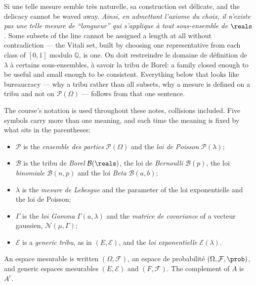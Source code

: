 Si une telle mesure semble très naturelle, sa construction est délicate, and the
delicacy cannot be waved away. \emph{Ainsi, en admettant l'axiome du choix, il
n'existe pas une telle mesure de ``longueur'' qui s'applique à tout sous-ensemble de
$\reals$.} Some subsets of the line cannot be assigned a length at all without
contradiction --- the Vitali set, built by choosing one representative from each
class of $[0,1]$ modulo $\mathbb{Q}$, is one. On doit restreindre le domaine de
définition de $\lambda$ à certains sous-ensembles, à savoir la tribu de Borel: a
family closed enough to be useful and small enough to be consistent. Everything
below that looks like bureaucracy --- why a tribu rather than all subsets, why a
mesure is defined on a tribu and not on $\mathcal{P}(\Omega)$ --- follows from that
one sentence.

\begin{notation}
  The course's notation is used throughout these notes, collisions included. Five
  symbols carry more than one meaning, and each time the meaning is fixed by what
  sits in the parentheses:
  \begin{itemize}
    \item $\mathcal{P}$ is the \emph{ensemble des parties} $\mathcal{P}(\Omega)$ and
      the \emph{loi de Poisson} $\mathcal{P}(\lambda)$;
    \item $\mathcal{B}$ is the tribu de \emph{Borel} $\mathcal{B}(\reals)$, the loi
      de \emph{Bernoulli} $\mathcal{B}(p)$, the loi \emph{binomiale}
      $\mathcal{B}(n,p)$ and the loi \emph{Beta}
      $\mathcal{B}(a,b)$;
    \item $\lambda$ is the \emph{mesure de Lebesgue} and the parameter of the loi
      exponentielle and the loi de Poisson;
    \item $\Gamma$ is the \emph{loi Gamma} $\Gamma(a,\lambda)$ and the
      \emph{matrice de covariance} of a vecteur gaussien, $\mathcal{N}(\mu,\Gamma)$;
    \item $\mathcal{E}$ is a \emph{generic tribu}, as in $(E,\mathcal{E})$, and the
      \emph{loi exponentielle} $\mathcal{E}(\lambda)$.
  \end{itemize}
  An espace mesurable is written $(\Omega,\mathcal{F})$, an espace de probabilité
  $(\Omega,\mathcal{F},\prob)$, and generic espaces mesurables $(E,\mathcal{E})$ and
  $(F,\mathcal{F})$. The complement of $A$ is $A^{c}$.
\end{notation}

